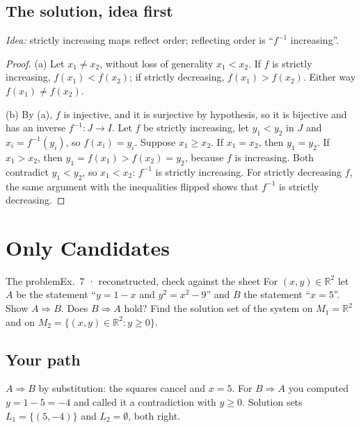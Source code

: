 \documentclass{kaelearn}
\begin{document}


\subsection{The solution, idea first}
\emph{Idea:} strictly increasing maps reflect order; reflecting order is ``$f^{-1}$ increasing''.
\begin{proof}
(a) Let $x_1\neq x_2$, without loss of generality $x_1<x_2$. If $f$ is strictly increasing, $f(x_1)<f(x_2)$; if
strictly decreasing, $f(x_1)>f(x_2)$. Either way $f(x_1)\neq f(x_2)$.

(b) By (a), $f$ is injective, and it is surjective by hypothesis, so it is bijective and has an inverse
$f^{-1}:J\to I$. Let $f$ be strictly increasing, let $y_1<y_2$ in $J$ and $x_i=f^{-1}(y_i)$, so $f(x_i)=y_i$. Suppose
$x_1\ge x_2$. If $x_1=x_2$, then $y_1=y_2$. If $x_1>x_2$, then $y_1=f(x_1)>f(x_2)=y_2$, because $f$ is increasing.
Both contradict $y_1<y_2$, so $x_1<x_2$: $f^{-1}$ is strictly increasing. For strictly decreasing $f$, the same
argument with the inequalities flipped shows that $f^{-1}$ is strictly decreasing.
\end{proof}

\section{Only Candidates}

\begin{panel}[unbreakable]{The problem}{Ex.\ 7 · reconstructed, check against the sheet}{}
For $(x,y)\in\mathbb{R}^2$ let $A$ be the statement ``$y=1-x$ and $y^2=x^2-9$'' and $B$ the statement ``$x=5$''.
Show $A\Rightarrow B$. Does $B\Rightarrow A$ hold? Find the solution set of the system on $M_1=\mathbb{R}^2$ and on
$M_2=\{(x,y)\in\mathbb{R}^2: y\ge0\}$.
\end{panel}

\subsection{Your path}
$A\Rightarrow B$ by substitution: the squares cancel and $x=5$. For $B\Rightarrow A$ you computed $y=1-5=-4$ and
called it a contradiction with $y\ge0$. Solution sets $L_1=\{(5,-4)\}$ and $L_2=\emptyset$, both right.
\end{document}
